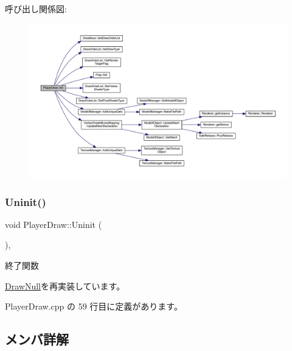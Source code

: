 呼び出し関係図\+:
\nopagebreak
\begin{figure}[H]
\begin{center}
\leavevmode
\includegraphics[width=350pt]{class_player_draw_ad79a0fbeb618e0913822b573e5d0be68_cgraph}
\end{center}
\end{figure}
\mbox{\label{class_player_draw_a917b2947914287f23d87ca75cd68f553}} 
\subsubsection{\texorpdfstring{Uninit()}{Uninit()}}
{\footnotesize\ttfamily void Player\+Draw\+::\+Uninit (\begin{DoxyParamCaption}{ }\end{DoxyParamCaption})\hspace{0.3cm}{\ttfamily [override]}, {\ttfamily [virtual]}}



終了関数 



\mbox{\hyperlink{class_draw_null_a12d44e341c7364b5ab9cdd661dc16187}{Draw\+Null}}を再実装しています。



 Player\+Draw.\+cpp の 59 行目に定義があります。



\subsection{メンバ詳解}
\mbox{\label{class_player_draw_a924cd73d9d8b1b2e662be2c79238354f}} 
